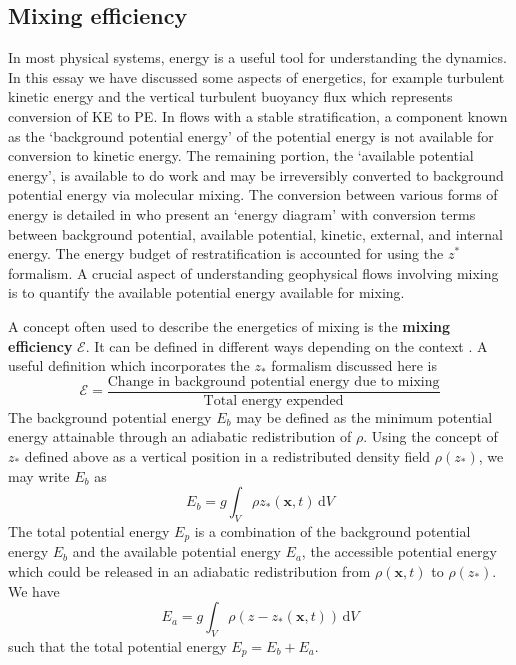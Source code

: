 \documentclass[a4paper]{article}
\begin{document}
\subsection{Mixing efficiency}
\label{sec:energetics}

In most physical systems, energy is a useful tool for understanding the dynamics. In this essay we have
discussed some aspects of energetics, for example turbulent kinetic energy and the vertical turbulent buoyancy
flux which represents conversion of KE to PE. In flows with a stable stratification, a component known as the
`background potential energy' of the potential energy is not available for conversion to kinetic energy. The
remaining portion, the `available potential energy', is available to do work and may be irreversibly converted
to background potential energy via molecular mixing. The conversion between various forms of energy is
detailed in \citet{winters1995} who present an `energy diagram' with conversion terms between background
potential, available potential, kinetic, external, and internal energy. The energy budget of restratification
is accounted for using the $z^*$ formalism. A crucial aspect of understanding geophysical flows involving
mixing is to quantify the available potential energy available for mixing. 

A concept often used to describe the energetics of mixing is the \textbf{mixing efficiency} $\mathcal{E}$. It
can be defined in different ways depending on the context \citep{gregg2018}. A useful definition which
incorporates the $z_*$ formalism discussed here is
\begin{equation}
	\mathcal{E} = \frac{\text{Change in background potential energy due to mixing}}{\text{Total energy expended}}
\end{equation}
The background potential energy $E_b$ may be defined as the minimum potential energy attainable through an
adiabatic redistribution of $\rho$. Using the concept of $z_*$ defined above as a vertical position in a
redistributed density field $\rho(z_*)$, we may write $E_b$ as
\begin{equation}
	E_b = g \int_V \rho z_*(\bm{x},t)\,\mathrm{d}V
\end{equation}
The total potential energy $E_p$ is a combination of the background potential energy $E_b$ and the
available potential energy $E_a$, the accessible potential energy which could be released in an adiabatic
redistribution from $\rho(\bm{x},t)$ to $\rho(z_*)$. We have
\begin{equation}
	E_a = g \int_V \rho \left(z-z_*(\bm{x},t)\right)\,\mathrm{d}V
\end{equation}
such that the total potential energy $E_p = E_b + E_a$. 
\end{document}
